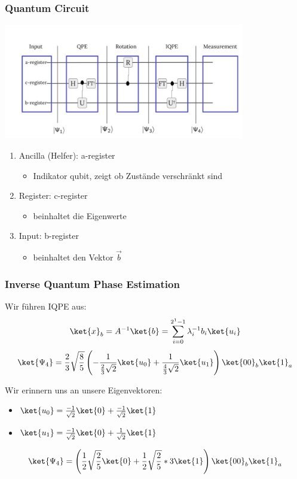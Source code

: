 \begin{frame}
    \frametitle{Quantum Circuit}
    \begin{center}
    \includegraphics[width=10.5cm]{img/hhl_circuit/hhl_circuit.jpg}
    \end{center}
    \begin{enumerate}
        \item Ancilla (Helfer): a-register
        \begin{itemize}
            \item Indikator qubit, zeigt ob Zustände verschränkt sind
        \end{itemize}

        \item Register: c-register
        \begin{itemize}
            \item beinhaltet die Eigenwerte
        \end{itemize}
        
        \item Input: b-register 
        \begin{itemize}
            \item beinhaltet den Vektor $\vec{b}$
        \end{itemize}
        
    \end{enumerate}
   \end{frame}



\begin{frame}
    \frametitle{Inverse Quantum Phase Estimation}

    Wir führen IQPE aus:
    $$ \ket{x}_b =  A^{-1} \ket{b} = 
    \sum_{i=0}^{2^{1}-1} 
    \lambda_i^{-1} b_i\ket{u_i} $$
    $$\ket{\Psi_4}=\frac{2}{3}\sqrt{\frac{8}{5}} \left( -\frac{1}{\frac{2}{3}\sqrt{2}} \ket{u_0} +\frac{1}   {\frac{4}{3}\sqrt{2}}  \ket{u_1}\right)  \ket{00}_b \ket{1}_a $$

    \hfil

    Wir erinnern uns an unsere Eigenvektoren:
    \begin{itemize}
        \item $ \ket{u_0} = \frac{-1}{\sqrt{2}}\ket{0} + \frac{-1}{\sqrt{2}}\ket{1}$ 
        \item $ \ket{u_1}= \frac{-1}{\sqrt{2}}\ket{0} + \frac{1}{\sqrt{2}}\ket{1}$ 
    \end{itemize}

    $$ \ket{\Psi_4}= \left(\frac{1}{2}\sqrt{\frac{2}{5}} \ket{0} +\frac{1}{2}\sqrt{\frac{2}{5}} * 3 \ket{1} \right) \ket{00}_b \ket{1}_a $$

\end{frame}

